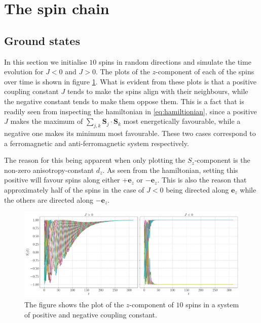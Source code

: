 \section{The spin chain}

\subsection{Ground states}\label{sec:groundstates}

In this section we initialise $10$ spins in random directions and simulate the time evolution for $J <0$ and $J>0$. The plots of the $z$-component of each of the spins over time is shown in figure \ref{fig:gs}. What is evident from these plots is that a positive coupling constant $J$ tends to make the spins align with their neighbours, while the negative constant tends to make them oppose them. This is a fact that is readily seen from inspecting the hamiltonian in \eqref{eq:hamiltionian}, since a positive $J$ makes the maximum of $\sum_{j,k} \mathbf{S}_j \cdot \mathbf{S}_k$ most energetically favourable, while a negative one makes its minimum most favourable. These two cases correspond to a ferromagnetic and anti-ferromagnetic system respectively.

The reason for this being apparent when only plotting the $S_z$-component is the non-zero anisotropy-constant $d_z$. As seen from the hamiltonian, setting this positive will favour spins along either $+\mathbf{e}_z$ or $-\mathbf{e}_z$. This is also the reason that approximately half of the spins in the case of $J<0$ being directed along $\mathbf{e}_z$ while the others are directed along $-\mathbf{e}_z$.

\begin{figure}[htb]
	\centering
	\includegraphics[width=\columnwidth]{../fig/gs.pdf}
	\caption{The figure shows the plot of the $z$-component of $10$ spins in a system of positive and negative coupling constant.}
	\label{fig:gs}
\end{figure}

